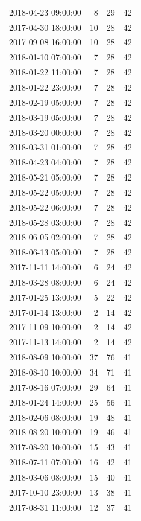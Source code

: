 \begin{tabular}{lrrr}
2018-04-23 09:00:00 & 8 & 29 & 42 \\
2017-04-30 18:00:00 & 10 & 28 & 42 \\
2017-09-08 16:00:00 & 10 & 28 & 42 \\
2018-01-10 07:00:00 & 7 & 28 & 42 \\
2018-01-22 11:00:00 & 7 & 28 & 42 \\
2018-01-22 23:00:00 & 7 & 28 & 42 \\
2018-02-19 05:00:00 & 7 & 28 & 42 \\
2018-03-19 05:00:00 & 7 & 28 & 42 \\
2018-03-20 00:00:00 & 7 & 28 & 42 \\
2018-03-31 01:00:00 & 7 & 28 & 42 \\
2018-04-23 04:00:00 & 7 & 28 & 42 \\
2018-05-21 05:00:00 & 7 & 28 & 42 \\
2018-05-22 05:00:00 & 7 & 28 & 42 \\
2018-05-22 06:00:00 & 7 & 28 & 42 \\
2018-05-28 03:00:00 & 7 & 28 & 42 \\
2018-06-05 02:00:00 & 7 & 28 & 42 \\
2018-06-13 05:00:00 & 7 & 28 & 42 \\
2017-11-11 14:00:00 & 6 & 24 & 42 \\
2018-03-28 08:00:00 & 6 & 24 & 42 \\
2017-01-25 13:00:00 & 5 & 22 & 42 \\
2017-01-14 13:00:00 & 2 & 14 & 42 \\
2017-11-09 10:00:00 & 2 & 14 & 42 \\
2017-11-13 14:00:00 & 2 & 14 & 42 \\
2018-08-09 10:00:00 & 37 & 76 & 41 \\
2018-08-10 10:00:00 & 34 & 71 & 41 \\
2017-08-16 07:00:00 & 29 & 64 & 41 \\
2018-01-24 14:00:00 & 25 & 56 & 41 \\
2018-02-06 08:00:00 & 19 & 48 & 41 \\
2018-08-20 10:00:00 & 19 & 46 & 41 \\
2017-08-20 10:00:00 & 15 & 43 & 41 \\
2018-07-11 07:00:00 & 16 & 42 & 41 \\
2018-03-06 08:00:00 & 15 & 40 & 41 \\
2017-10-10 23:00:00 & 13 & 38 & 41 \\
2017-08-31 11:00:00 & 12 & 37 & 41 \\

\end{tabular}
